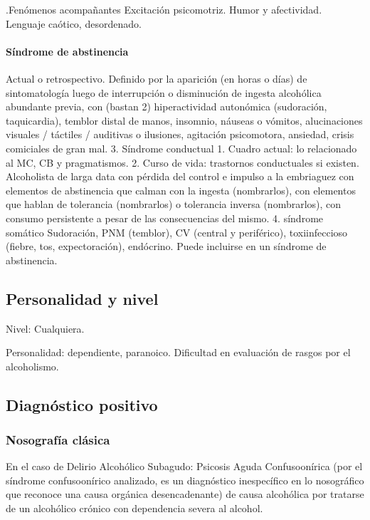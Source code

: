 \documentclass{scrbook}
\begin{document}
.Fenómenos acompañantes
Excitación psicomotriz. Humor y afectividad. Lenguaje caótico, desordenado.

\paragraph{Síndrome de abstinencia}
Actual o retrospectivo. Definido por la aparición (en horas o días) de sintomatología luego de interrupción o disminución de ingesta alcohólica abundante previa, con (bastan 2) hiperactividad autonómica (sudoración, taquicardia), temblor distal de manos, insomnio, náuseas o vómitos, alucinaciones visuales / táctiles / auditivas o ilusiones, agitación psicomotora, ansiedad, crisis comiciales de gran mal. 3. Síndrome conductual 1. Cuadro actual: lo relacionado al MC, CB y pragmatismos. 2. Curso de vida: trastornos conductuales si existen. Alcoholista de larga data con pérdida del control e impulso a la embriaguez con elementos de abstinencia que calman con la ingesta (nombrarlos), con elementos que hablan de tolerancia (nombrarlos) o tolerancia inversa (nombrarlos), con consumo persistente a pesar de las consecuencias del mismo. 4. síndrome somático Sudoración, PNM (temblor), CV (central y periférico), toxiinfeccioso (fiebre, tos, expectoración), endócrino. Puede incluirse en un síndrome de abstinencia.

\subsection*{Personalidad y nivel}
Nivel: Cualquiera.

Personalidad: dependiente, paranoico. Dificultad en evaluación de rasgos por el alcoholismo.
\subsection*{Diagnóstico positivo}
\subsubsection*{Nosografía clásica}
En el caso de Delirio Alcohólico Subagudo: Psicosis \faArrowRight Aguda \faArrowRight Confuso\-onírica (por el síndrome confuso\-onírico analizado, es un diagnóstico inespecífico en lo nosográfico que reconoce una causa orgánica desencadenante) \faArrowRight de causa alcohólica por tratarse de un alcohólico crónico con dependencia severa al alcohol.
\end{document}
